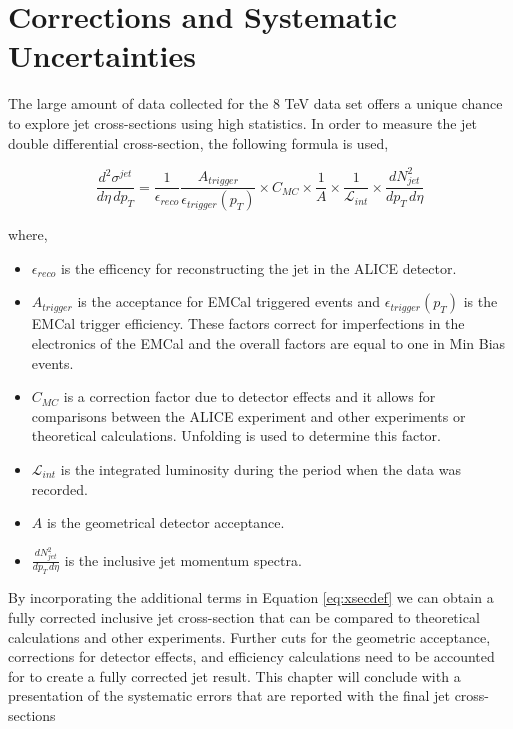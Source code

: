 \chapter{Corrections and Systematic Uncertainties} \label{ch:error}

The large amount of data collected for the 8 TeV data set offers a unique chance to explore jet cross-sections using high statistics.   In order to measure the jet double differential cross-section, the following formula is used,

\begin{equation}
	\frac{d^{2} \sigma^{jet}}{d\eta \, dp_{T}} = \frac{1}{\epsilon_{reco}} \frac{A_{trigger}}{\epsilon_{trigger}(p_{T})} \times C_{MC} \times \frac{1}{A} \times \frac{1}{\mathscr{L}_{int}} \times \frac{dN^{2}_{jet}}{dp_{T} \, d\eta}
\label{eq:xsecdef}
\end{equation}

\noindent
where,

\begin{itemize}
  \item $\epsilon_{reco}$ is the efficency for reconstructing the jet in the ALICE detector.
  \item $A_{trigger}$ is the acceptance for EMCal triggered events and $\epsilon_{trigger}(p_{T})$ is the EMCal trigger efficiency.  These factors correct for imperfections in the electronics of the EMCal and the overall factors are equal to one in Min Bias events.
  \item $C_{MC}$ is a correction factor due to detector effects and it allows for comparisons between the ALICE experiment and other experiments or theoretical calculations.  Unfolding is used to determine this factor.
  \item $\mathscr{L}_{int}$ is the integrated luminosity during the period when the data was recorded.
  \item $A$ is the geometrical detector acceptance.
  \item $\frac{dN^{2}_{jet}}{dp_{T} \, d\eta}$ is the inclusive jet momentum spectra.
  
\end{itemize}

By incorporating the additional terms in Equation \ref{eq:xsecdef} we can obtain a fully corrected inclusive jet cross-section that can be compared to theoretical calculations and other experiments.  Further cuts for the geometric acceptance, corrections for detector effects, and efficiency calculations need to be accounted for to create a fully corrected jet result.  This chapter will conclude with a presentation of the systematic errors that are reported with the final jet cross-sections

